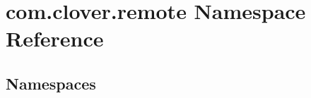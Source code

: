 \hypertarget{namespacecom_1_1clover_1_1remote}{}\section{com.\+clover.\+remote Namespace Reference}
\label{namespacecom_1_1clover_1_1remote}
\subsection*{Namespaces}
\begin{DoxyCompactItemize}
\end{DoxyCompactItemize}
